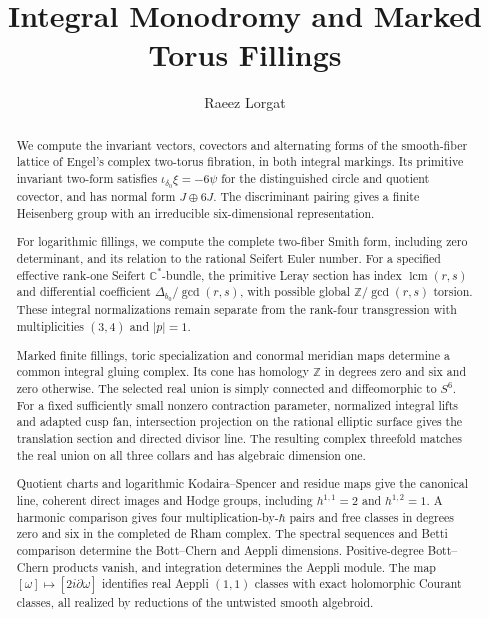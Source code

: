 \documentclass[11pt]{article}
\title{Integral Monodromy and Marked Torus Fillings}
\author{Raeez Lorgat}
\date{}
\numberwithin{equation}{section}
\begin{document}
\maketitle

\begin{abstract}
We compute the invariant vectors, covectors and alternating forms of
the smooth-fiber lattice of Engel's complex two-torus fibration,
in both integral markings.
Its primitive invariant two-form satisfies
$\iota_{\delta_0}\xi=-6\psi$ for the distinguished circle and quotient
covector, and has normal form $J\oplus6J$.
The discriminant pairing gives a finite Heisenberg group with an
irreducible six-dimensional representation.

For logarithmic fillings, we compute the complete two-fiber Smith
form, including zero determinant, and its relation to the rational
Seifert Euler number. For a specified effective rank-one Seifert
$\mathbb C^*$-bundle, the primitive Leray section has index
$\operatorname{lcm}(r,s)$ and differential coefficient
$\Delta_{b_0}/\gcd(r,s)$, with possible global
$\mathbb Z/\gcd(r,s)$ torsion.
These integral normalizations remain separate from the rank-four
transgression with multiplicities $(3,4)$ and $|p|=1$.

Marked finite fillings, toric specialization and conormal meridian
maps determine a common integral gluing complex. Its cone has
homology $\mathbb Z$ in degrees zero and six and zero otherwise.
The selected real union is simply connected and diffeomorphic to $S^6$.
For a fixed sufficiently small nonzero contraction parameter,
normalized integral lifts and adapted cusp fan, intersection
projection on the rational elliptic surface gives the translation
section and directed divisor line. The resulting complex threefold
matches the real union on all three collars and has algebraic
dimension one.

Quotient charts and logarithmic Kodaira--Spencer and residue maps
give the canonical line, coherent direct images and Hodge groups,
including $h^{1,1}=2$ and $h^{1,2}=1$.
A harmonic comparison gives four multiplication-by-$\hbar$ pairs
and free classes in degrees zero and six in the completed de Rham complex.
The spectral sequences and Betti comparison determine the
Bott--Chern and Aeppli dimensions. Positive-degree Bott--Chern
products vanish, and integration determines the Aeppli module.
The map $[\omega]\mapsto[2i\partial\omega]$ identifies real Aeppli
$(1,1)$ classes with exact holomorphic Courant classes, all realized by
reductions of the untwisted smooth algebroid.


\end{abstract}
\end{document}
